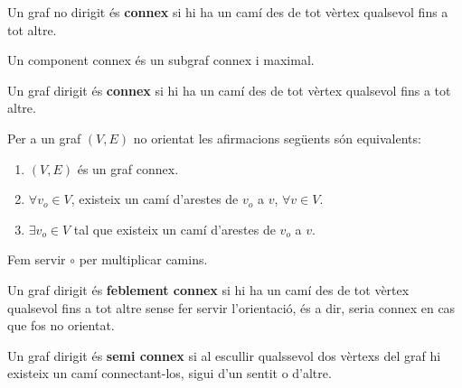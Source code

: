 \documentclass[../main.tex]{subfiles}
\begin{document}
    \begin{definicio}
        Un graf no dirigit és \textbf{connex} si hi ha un camí des de tot vèrtex qualsevol fins a tot 
        altre.
    \end{definicio}
    \begin{definicio}
        Un component connex és un subgraf connex i maximal.
    \end{definicio}
    \begin{definicio}
        Un graf dirigit és \textbf{connex} si hi ha un camí des de tot vèrtex qualsevol fins a tot 
        altre.
    \end{definicio}
    \begin{proposicio}
        Per a un graf $(V, E)$ no orientat les afirmacions següents són equivalents:
        \begin{enumerate}
            \item $(V, E)$ és un graf connex.
            \item $\forall v_o\in V$, existeix un camí d'arestes de $v_o$ a $v$, $\forall v \in V$.
            \item $\exists v_o \in V$ tal que existeix un camí d'arestes de $v_o$ a $v$.
        \end{enumerate}
    \end{proposicio}
    \begin{notacio}
        Fem servir $\circ$ per multiplicar camins. 
    \end{notacio}
    \begin{definicio}
        Un graf dirigit és \textbf{feblement connex} si hi ha un camí des de tot vèrtex qualsevol fins a tot 
        altre sense fer servir l'orientació, és a dir, seria connex en cas que fos no orientat.
    \end{definicio}
    \begin{definicio}
        Un graf dirigit és \textbf{semi connex} si al escullir qualssevol dos vèrtexs del graf hi
        existeix un camí connectant-los, sigui d'un sentit o d'altre.
    \end{definicio}
\end{document}
